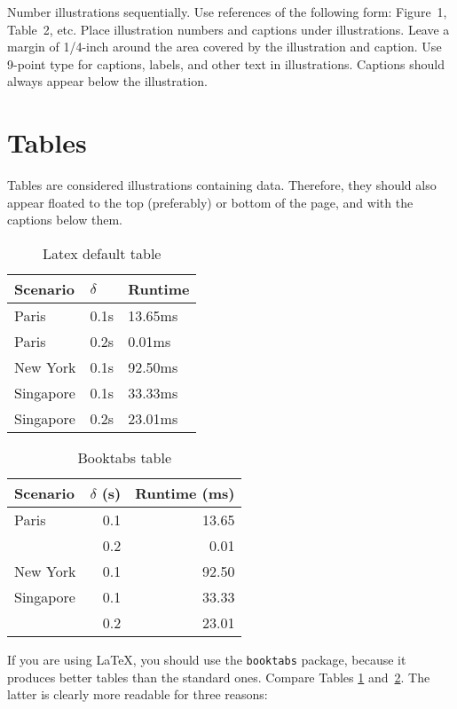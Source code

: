 \documentclass{article}
\begin{document}
Number illustrations sequentially. Use references of the following
form: Figure~1, Table~2, etc. Place illustration numbers and captions
under illustrations. Leave a margin of 1/4-inch around the area
covered by the illustration and caption.  Use 9-point type for
captions, labels, and other text in illustrations. Captions should always appear below the illustration.

\section{Tables}

Tables are considered illustrations containing data. Therefore, they should also appear floated to the top (preferably) or bottom of the page, and with the captions below them.

\begin{table}
\centering
\begin{tabular}{lll}
\hline
Scenario  & $\delta$ & Runtime \\
\hline
Paris       & 0.1s  & 13.65ms     \\
Paris       & 0.2s  & 0.01ms      \\
New York    & 0.1s  & 92.50ms     \\
Singapore   & 0.1s  & 33.33ms     \\
Singapore   & 0.2s  & 23.01ms     \\
\hline
\end{tabular}
\caption{Latex default table}
\label{tab:plain}
\end{table}

\begin{table}
\centering
\begin{tabular}{lrr}
\toprule
Scenario  & $\delta$ (s) & Runtime (ms) \\
\midrule
Paris       & 0.1  & 13.65      \\
            & 0.2  & 0.01       \\
New York    & 0.1  & 92.50      \\
Singapore   & 0.1  & 33.33      \\
            & 0.2  & 23.01      \\
\bottomrule
\end{tabular}
\caption{Booktabs table}
\label{tab:booktabs}
\end{table}

If you are using \LaTeX, you should use the \texttt{booktabs} package, because
it produces better tables than the standard ones. Compare Tables
\ref{tab:plain} and~\ref{tab:booktabs}. The latter is clearly more readable for
three reasons:
\end{document}
